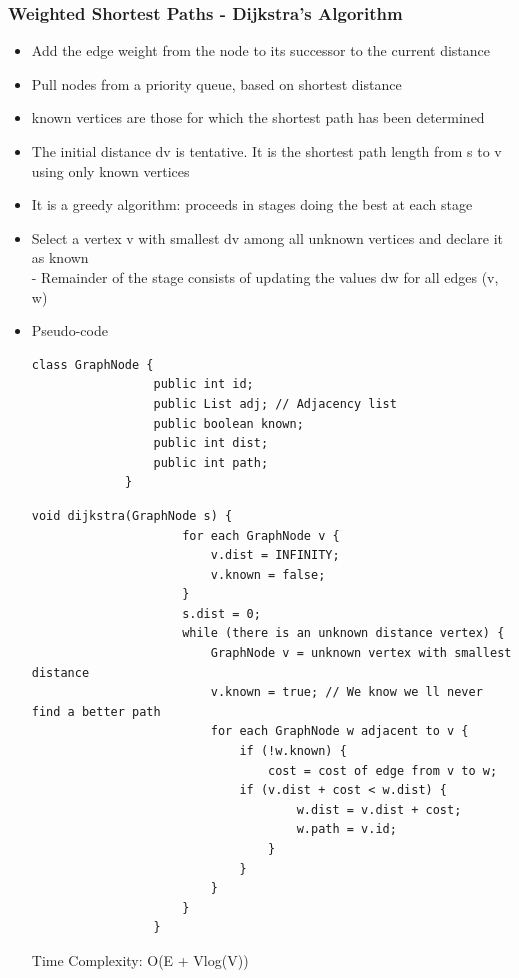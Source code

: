 \documentclass[10pt]{article}
\begin{document}
\subsubsection{Weighted Shortest Paths - Dijkstra's Algorithm}
\begin{itemize}
    \item Add the edge weight from the node to its successor to the current distance
    \item Pull nodes from a priority queue, based on shortest distance
    \item known vertices are those for which the shortest path has been determined
    \item The initial distance dv is tentative. It is the shortest path length from s to v using only known vertices
    \item It is a greedy algorithm: proceeds in stages doing the best at each stage
    \item Select a vertex v with smallest dv among all unknown vertices and declare it as known
          \\- Remainder of the stage consists of updating the values dw for all edges (v, w)
    \item Pseudo-code
          \begin{lstlisting}[style=java]
             class GraphNode {
                 public int id;
                 public List adj; // Adjacency list
                 public boolean known;
                 public int dist;
                 public int path;
             }
         \end{lstlisting}

          \begin{lstlisting}[style=java]
             void dijkstra(GraphNode s) {
                     for each GraphNode v {
                         v.dist = INFINITY;
                         v.known = false;
                     }
                     s.dist = 0;
                     while (there is an unknown distance vertex) {
                         GraphNode v = unknown vertex with smallest distance
                         v.known = true; // We know we ll never find a better path
                         for each GraphNode w adjacent to v {
                             if (!w.known) {
                                 cost = cost of edge from v to w;
                             if (v.dist + cost < w.dist) {
                                     w.dist = v.dist + cost;
                                     w.path = v.id;
                                 } 
                             }
                         }
                     }
                 }
         \end{lstlisting}
          Time Complexity: O(E + Vlog(V))
\end{itemize}
\end{document}
